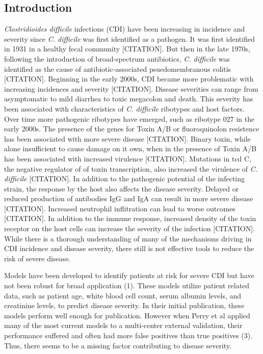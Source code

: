 \documentclass[
  12pt,
]{article}
\begin{document}
\newpage

\hypertarget{introduction}{%
\subsection{Introduction}\label{introduction}}

\emph{Clostridioides difficile} infections (CDI) have been increasing in
incidence and severity since \emph{C. difficile} was first identified as
a pathogen. It was first identified in 1931 in a healthy fecal community
{[}CITATION{]}. But then in the late 1970s, following the introduction
of broad-spectrum antibiotics, \emph{C. difficile} was identified as the
cause of antibiotic-associated psuedomembranous colitis {[}CITATION{]}.
Beginning in the early 2000s, CDI became more problematic with
increasing incidences and severity {[}CITATION{]}. Disease severities
can range from asymptomatic to mild diarrhea to toxic megacolon and
death. This severity has been associated with characteristics of
\emph{C. difficile} ribotypes and host factors. Over time more
pathogenic ribotypes have emerged, such as ribotype 027 in the early
2000s. The presence of the genes for Toxin A/B or fluoroquinolon
resistence has been associated with more severe disease {[}CITATION{]}.
Binary toxin, while alone insufficient to cause damage on it own, when
in the presence of Toxin A/B has been associated with increased
virulence {[}CITATION{]}. Mutations in tcd C, the negative regulator of
of toxin transcription, also increased the virulence of \emph{C.
difficile} {[}CITATION{]}. In addition to the pathogenic potential of
the infecting strain, the response by the host also affects the disease
severity. Delayed or reduced production of antibodies IgG and IgA can
result in more severe disease {[}CITATION{]}. Increased neutrophil
inflitration can lead to worse outcomes {[}CITATION{]}. In addition to
the immune response, increased density of the toxin receptor on the host
cells can increase the severity of the infection {[}CITATION{]}. While
there is a thorough understanding of many of the mechanisms driving in
CDI incidence and disease severity, there still is not effective tools
to reduce the risk of severe disease.

Models have been developed to identify patients at risk for severe CDI
but have not been robust for broad application (1). These models utilize
patient related data, such as patient age, white blood cell count, serum
albumin levels, and creatinine levels, to predict disease severity. In
their initial publication, these models perform well enough for
publication. However when Perry et al applied many of the most current
models to a multi-center external validation, their performance suffered
and often had more false positives than true positives (3). Thus, there
seems to be a missing factor contributing to disease severity.
\end{document}
